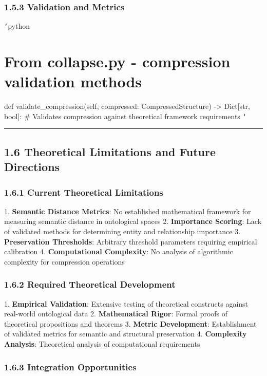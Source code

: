 \subsection{1.5.3 Validation and Metrics}

\texttt{`}python
\chapter{From collapse.py - compression validation methods}
def validate_compression(self, compressed: CompressedStructure) -> Dict[str, bool]:
    \# Validates compression against theoretical framework requirements
\texttt{`}

\hrule

\section{1.6 Theoretical Limitations and Future Directions}

\subsection{1.6.1 Current Theoretical Limitations}

1. \textbf{Semantic Distance Metrics}: No established mathematical framework for measuring semantic distance in ontological spaces
2. \textbf{Importance Scoring}: Lack of validated methods for determining entity and relationship importance
3. \textbf{Preservation Thresholds}: Arbitrary threshold parameters requiring empirical calibration
4. \textbf{Computational Complexity}: No analysis of algorithmic complexity for compression operations

\subsection{1.6.2 Required Theoretical Development}

1. \textbf{Empirical Validation}: Extensive testing of theoretical constructs against real-world ontological data
2. \textbf{Mathematical Rigor}: Formal proofs of theoretical propositions and theorems
3. \textbf{Metric Development}: Establishment of validated metrics for semantic and structural preservation
4. \textbf{Complexity Analysis}: Theoretical analysis of computational requirements

\subsection{1.6.3 Integration Opportunities}

